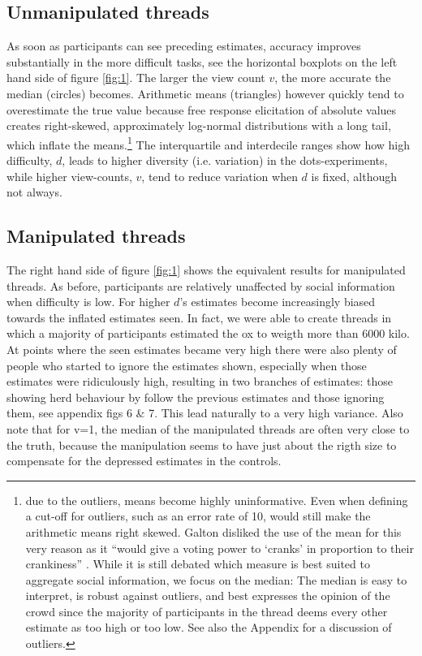 \documentclass[9pt,twocolumn,twoside,lineno]{article}
\begin{document}
\subsection*{Unmanipulated threads}
As soon as participants can see preceding estimates, accuracy improves substantially in the more difficult tasks, see the horizontal boxplots on the left hand side of figure \ref{fig:1}. The larger the view count $v$, the more accurate the median (circles) becomes. Arithmetic means (triangles) however quickly tend to overestimate the true value because free response elicitation of absolute values creates right-skewed, approximately log-normal distributions with a long tail, which inflate the means.\footnote{due to the outliers, means become highly uninformative. Even when defining a cut-off for outliers, such as an error rate of 10, would still make the arithmetic means right skewed. Galton disliked the use of the mean for this very reason as it “would give a voting power to ‘cranks’ in proportion to their crankiness” \cite{galton1907vox}. While it is still debated \cite{kao2018counteracting} which measure is best suited to aggregate social information, we focus on the median: The median is easy to interpret, is robust against outliers, and best expresses the opinion of the crowd since the majority of participants in the thread deems every other estimate as too high or too low. See also the Appendix for a discussion of outliers.} The interquartile and interdecile ranges show how high difficulty, $d$, leads to higher diversity (i.e. variation) in the dots-experiments, while higher view-counts, $v$, tend to reduce variation when $d$ is fixed, although not always.

\subsection*{Manipulated threads}
The right hand side of figure \ref{fig:1} shows the equivalent results for manipulated threads. As before, participants are relatively unaffected by social information when difficulty is low. For higher $d$'s estimates become increasingly biased towards the inflated estimates seen. In fact, we were able to create threads in which a majority of participants estimated the ox to weigth more than 6000 kilo. At points where the seen estimates became very high there were also plenty of people who started to ignore the estimates shown, especially when those estimates were ridiculously high, resulting in two branches of estimates: those showing herd behaviour by follow the previous estimates and those ignoring them, see appendix figs 6 \& 7. This lead naturally to a very high variance. Also note that for v=1, the median of the manipulated threads are often very close to the truth, because the manipulation seems to have just about the rigth size to compensate for the depressed estimates in the controls.
\end{document}
